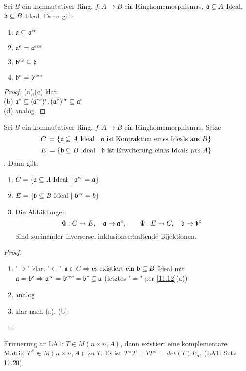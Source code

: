 \begin{bem} \label{11.12}
	Sei $B$ ein kommutativer Ring, $f: A \to B $ ein Ringhomomorphismus, $\mathfrak{a} \subseteq A$ Ideal, $\mathfrak{b} \subseteq B $ Ideal. Dann gilt: 
	\begin{enumerate} [label= \alph*)]
		\item $\mathfrak{a} \subseteq \mathfrak{a}^{ec} $
		\item $\mathfrak{a}^e = \mathfrak{a}^{ece}$
		\item $\mathfrak{b}^{ce} \subseteq \mathfrak{b} $
		\item $\mathfrak{b}^{c} = \mathfrak{b}^{cec}$ 
	\end{enumerate}
\end{bem}
\begin{proof}
	(a),(c) klar.  \\
	(b) $\mathfrak{a}^e \subseteq (\mathfrak{a}^{ec})^e , (\mathfrak{a}^e)^{ce} \subseteq \mathfrak{a}^e$ \\
	(d) analog. 
\end{proof}
\begin{sa} \label{11.13}
	Sei $B$ ein kommutativer Ring, $f: A \to B $ ein Ringhomomorphismus. Setze
	$$C := \{ \mathfrak{a} \subseteq A \ \text{Ideal} \ | \ \mathfrak{a} \ \text{ist Kontraktion eines Ideals aus }B \} $$
	$$E:= \{\b \subseteq B \ \text{Ideal} \ | \ \b \ \text{ist Erweiterung eines Ideals aus } A\} $$. Dann gilt:
	\begin{enumerate} [label= \alph*)]
		\item $C=\{\mathfrak{a} \subseteq A \ \text{Ideal} \ | \ \mathfrak{a}^{ec} = \mathfrak{a} \} $
		\item $E= \{\b \subseteq B \ \text{Ideal} \ |\ \b^{ce} = b\} $
		\item Die Abbildungen $$\Phi: C \to E, \quad \mathfrak{a} \mapsto \mathfrak{a}^e, \quad \quad \Psi: E \to C, \quad \mathfrak{b} \mapsto \mathfrak{b}^c $$ Sind zueinander inverserse, inklusionserhaltende Bijektionen.
	\end{enumerate}
\end{sa}
\begin{proof}
	\begin{enumerate} [label= \alph*)]
		\item "$\supseteq$" klar. "$\subseteq$" $\mathfrak{a} \in C \Rightarrow \text{es existiert ein } \mathfrak{b} \subseteq B $ Ideal mit $ \mathfrak{a} = \mathfrak{b}^c \Rightarrow \mathfrak{a}^{ec} = \mathfrak{b}^{cec} = \mathfrak{b}^c \subseteq \mathfrak{a}$ (letztes "$=$" per \ref{11.12}(d))
		\item analog 
		\item klar nach (a), (b).
	\end{enumerate}
\end{proof}
\begin{anm}
	Erinnerung an LA1: $T \in M(n \times n, A)$, dann existiert eine komplementäre Matrix $T^{\#} \in M(n \times n, A)$ zu $T$. Es ist $T^{\#}T = TT^{\#} = det(T)E_n.$ (LA1: Satz 17.20)
\end{anm}
